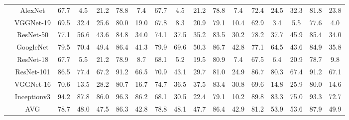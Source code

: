 \documentclass[12pt,italian]{article}
\begin{document}
\begin{tiny}
\begin{longtable}{lcccccccccccccccc}
& AlexNet & 67.7 &  4.5 & 21.2 & 78.8 &  7.4 & 67.7 &  4.5 & 21.2 & 78.8 &  7.4 & 72.4 & 24.5 & 32.3 & 81.8 & 23.8 \\ 
& VGGNet-19 & 69.5 & 32.4 & 25.6 & 80.0 & 19.0 & 67.8 &  8.3 & 20.9 & 79.1 & 10.4 & 62.9 &  3.4 &  5.5 & 77.6 &  4.0 \\ 
& ResNet-50 & 77.1 & 56.6 & 43.6 & 84.8 & 34.0 & 74.1 & 37.5 & 35.2 & 83.5 & 30.2 & 78.2 & 37.7 & 45.9 & 85.4 & 34.0 \\ 
& GoogleNet & 79.5 & 70.4 & 49.4 & 86.4 & 41.3 & 79.9 & 69.6 & 50.3 & 86.7 & 42.8 & 77.1 & 64.5 & 43.6 & 84.9 & 35.8 \\ 
& ResNet-18 & 67.7 &  5.5 & 21.2 & 78.9 &  8.7 & 68.1 &  5.2 & 19.5 & 80.9 &  7.4 & 67.5 &  6.4 & 20.9 & 78.7 &  9.8 \\ 
& ResNet-101 & 86.5 & 77.4 & 67.2 & 91.2 & 66.5 & 70.9 & 43.1 & 29.7 & 81.0 & 24.9 & 86.7 & 80.3 & 67.4 & 91.2 & 67.1 \\ 
& VGGNet-16 & 70.6 & 13.5 & 28.2 & 80.7 & 16.7 & 74.7 & 36.5 & 37.5 & 83.4 & 30.8 & 69.6 & 14.8 & 25.9 & 80.0 & 14.6 \\ 
& Inceptionv3 & 94.2 & 87.8 & 86.0 & 96.3 & 86.2 & 68.1 & 30.5 & 22.4 & 79.1 & 10.2 & 89.8 & 83.3 & 75.0 & 93.3 & 72.7 \\ 
\hline
& AVG & 78.7 & 48.0 & 47.5 & 86.3 & 42.8 & 78.8 & 48.1 & 47.7 & 86.4 & 42.9 & 81.2 & 53.9 & 53.6 & 87.9 & 49.9 \\ 
\hline
\bottomrule
\end{longtable} 

 \pagebreak 
\end{tiny} 
 
\end{document}
